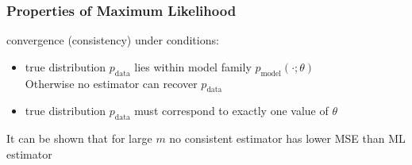 \documentclass{article}
\newcommand{\p}[1]{p_\text{#1}}
\begin{document}
\subsubsection*{Properties of Maximum Likelihood}
convergence (consistency) under conditions:
\begin{itemize}
    \item true distribution $\p{data}$ lies within model family $\p{model}(\cdot;\theta)$ \\
    Otherwise no estimator can recover $\p{data}$
    \item true distribution $\p{data}$ must correspond to exactly one value of $\theta$
\end{itemize}
It can be shown that for large $m$ no consistent estimator has lower MSE than ML estimator
\end{document}
